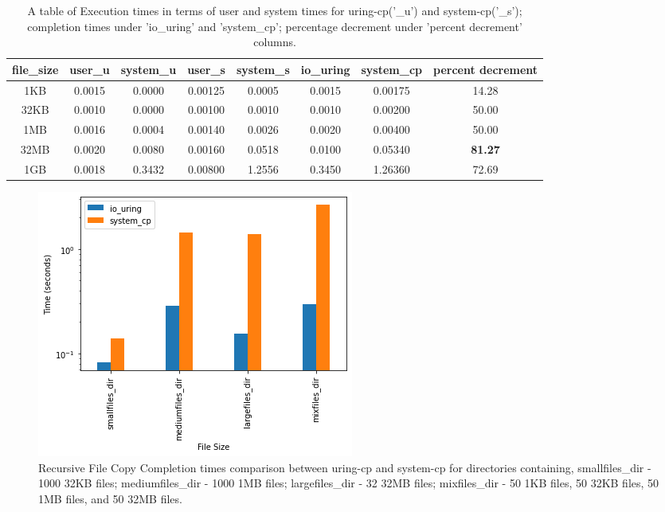 \documentclass{article}
\begin{document}
\begin{table}
\centering
\begin{tabular}{|c|c|c|c|c|c|c|c|}

    \hline
    file\_size & user\_u & system\_u & user\_s & system\_s & io\_uring & system\_cp & percent decrement\\
    \hline
    1KB    &   0.0015  & 0.0000 &0.00125 &  0.0005  & 0.0015 &  0.00175 &14.28 \\
    \hline
    32KB   &   0.0010  & 0.0000 &0.00100 &  0.0010  & 0.0010 &  0.00200 &50.00 \\
    \hline
    1MB    &   0.0016  & 0.0004 &0.00140 &  0.0026  & 0.0020 &  0.00400 &50.00 \\
    \hline
    32MB   &   0.0020  & 0.0080 &0.00160 &  0.0518  & 0.0100 &  0.05340 &\textbf{81.27} \\
    \hline
    1GB    &   0.0018  & 0.3432 &0.00800 &  1.2556  & 0.3450 &  1.26360 &72.69 \\
    \hline

\end{tabular}
\caption{\label{tab:widgets}A table of Execution times in terms of user and system times for uring-cp('\_u') 
and system-cp('\_s'); completion times under 'io\_uring' and 'system\_cp'; percentage decrement under 
'percent decrement' columns.}
\vspace{0.5cm}
\end{table}

\begin{figure}
    \centering
    \includegraphics[scale = 0.6]{cp_perf_recursive_compare.png}
    \caption{Recursive File Copy Completion times comparison between uring-cp and system-cp for directories containing, 
    smallfiles\_dir - 1000 32KB files; 
    mediumfiles\_dir - 1000 1MB files; 
    largefiles\_dir - 32 32MB files; 
    mixfiles\_dir - 50 1KB files, 50 32KB files, 50 1MB files, and 50 32MB files.}
    \label{Figure7}
\end{figure}
\end{document}
